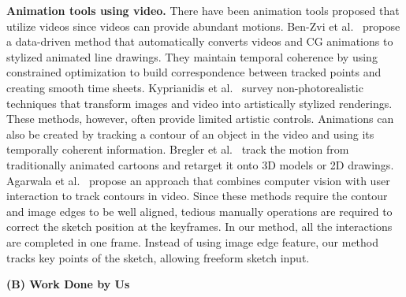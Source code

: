 \textbf{Animation tools using video.} There have been animation tools proposed that utilize videos since videos can 
provide abundant motions.  Ben-Zvi et al.~\cite{ben2015line} propose a data-driven method that automatically converts videos and CG animations to stylized animated 
line drawings.  They maintain temporal coherence by using constrained optimization to build correspondence between tracked points and creating smooth time sheets. 
Kyprianidis et al.~\cite{Kyprianidis:2013} survey non-photorealistic techniques that transform images and video into artistically stylized renderings.
These methods, however, often provide limited artistic controls. 
Animations can also be created by tracking a contour of an object in the video and using its temporally coherent information.
Bregler et al.~\cite{Bregler:2002} track the motion from traditionally animated cartoons and retarget it onto 3D models or 2D drawings. 
Agarwala et al.~\cite{Agarwala:2004} propose an approach that combines computer vision with user interaction to track contours in video. 
Since these methods require the contour and image edges to be well aligned, tedious manually operations are required to correct the sketch position at the keyframes. 
In our method, all the interactions are completed in one frame. Instead of using image edge feature, 
our method tracks key points of the sketch, allowing freeform sketch input.



\textbf{(B) Work Done by Us}


